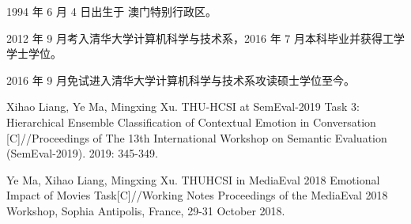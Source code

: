 \begin{resume}


  1994 年 6 月 4 日出生于 澳门特别行政区。

  2012 年 9 月考入清华大学计算机科学与技术系，2016 年 7 月本科毕业并获得工学学士学位。

  2016 年 9 月免试进入清华大学计算机科学与技术系攻读硕士学位至今。



  \begin{publications}[before=\publicationskip,after=\publicationskip]

    \item Xihao Liang, Ye Ma, Mingxing Xu. THU-HCSI at SemEval-2019 Task 3: Hierarchical Ensemble Classification of Contextual Emotion in Conversation [C]//Proceedings of The 13th International Workshop on Semantic Evaluation (SemEval-2019). 2019: 345-349.

    \item Ye Ma, Xihao Liang, Mingxing Xu. THUHCSI in MediaEval 2018 Emotional Impact of Movies Task[C]//Working Notes Proceedings of the MediaEval 2018 Workshop, Sophia Antipolis, France, 29-31 October 2018.

  \end{publications}



\end{resume}
